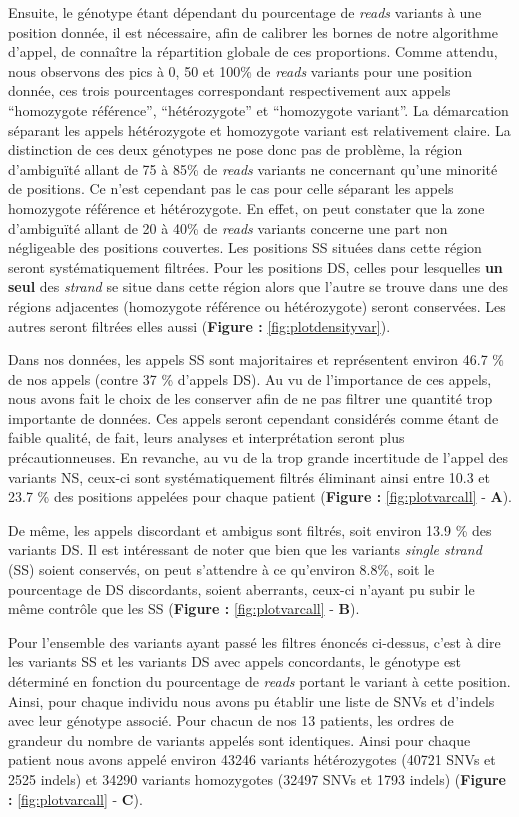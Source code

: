\documentclass[12pt,a4paper,twoside]{ugathesis}
\theoremstyle{definition}
\theoremstyle{definition}
\theoremstyle{definition}
\theoremstyle{remark}
\begin{document}
Ensuite, le génotype étant dépendant du pourcentage de \emph{reads}
variants à une position donnée, il est nécessaire, afin de calibrer les
bornes de notre algorithme d'appel, de connaître la répartition globale
de ces proportions. Comme attendu, nous observons des pics à 0, 50 et
100\% de \emph{reads} variants pour une position donnée, ces trois
pourcentages correspondant respectivement aux appels ``homozygote
référence'', ``hétérozygote'' et ``homozygote variant''. La démarcation
séparant les appels hétérozygote et homozygote variant est relativement
claire. La distinction de ces deux génotypes ne pose donc pas de
problème, la région d'ambiguïté allant de 75 à 85\% de \emph{reads}
variants ne concernant qu'une minorité de positions. Ce n'est cependant
pas le cas pour celle séparant les appels homozygote référence et
hétérozygote. En effet, on peut constater que la zone d'ambiguïté allant
de 20 à 40\% de \emph{reads} variants concerne une part non négligeable
des positions couvertes. Les positions SS situées dans cette région
seront systématiquement filtrées. Pour les positions DS, celles pour
lesquelles \textbf{un seul} des \emph{strand} se situe dans cette région
alors que l'autre se trouve dans une des régions adjacentes (homozygote
référence ou hétérozygote) seront conservées. Les autres seront filtrées
elles aussi (\textbf{Figure : }\ref{fig:plotdensityvar}).

Dans nos données, les appels SS sont majoritaires et représentent
environ 46.7 \% de nos appels (contre 37 \% d'appels DS). Au vu de
l'importance de ces appels, nous avons fait le choix de les conserver
afin de ne pas filtrer une quantité trop importante de données. Ces
appels seront cependant considérés comme étant de faible qualité, de
fait, leurs analyses et interprétation seront plus précautionneuses. En
revanche, au vu de la trop grande incertitude de l'appel des variants
NS, ceux-ci sont systématiquement filtrés éliminant ainsi entre 10.3 et
23.7 \% des positions appelées pour chaque patient (\textbf{Figure :
}\ref{fig:plotvarcall} - \textbf{A}).

De même, les appels discordant et ambigus sont filtrés, soit environ
13.9 \% des variants DS. Il est intéressant de noter que bien que les
variants \emph{single strand} (SS) soient conservés, on peut s'attendre
à ce qu'environ 8.8\%, soit le pourcentage de DS discordants, soient
aberrants, ceux-ci n'ayant pu subir le même contrôle que les SS
(\textbf{Figure : }\ref{fig:plotvarcall} - \textbf{B}).

Pour l'ensemble des variants ayant passé les filtres énoncés ci-dessus,
c'est à dire les variants SS et les variants DS avec appels concordants,
le génotype est déterminé en fonction du pourcentage de \emph{reads}
portant le variant à cette position. Ainsi, pour chaque individu nous
avons pu établir une liste de SNVs et d'indels avec leur génotype
associé. Pour chacun de nos 13 patients, les ordres de grandeur du
nombre de variants appelés sont identiques. Ainsi pour chaque patient
nous avons appelé environ 43246 variants hétérozygotes (40721 SNVs et
2525 indels) et 34290 variants homozygotes (32497 SNVs et 1793 indels)
(\textbf{Figure : }\ref{fig:plotvarcall} - \textbf{C}).
\end{document}
